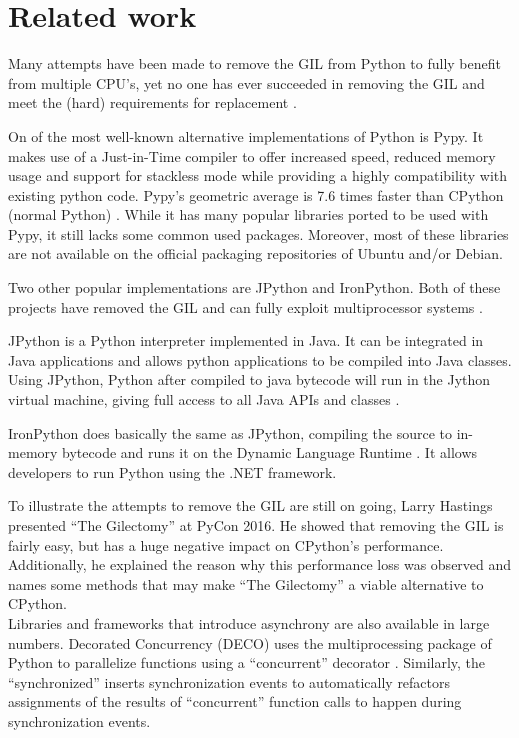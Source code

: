 \chapter{Related work}

Many attempts have been made to remove the GIL from Python to fully benefit from multiple CPU's, yet no one has ever succeeded in removing the GIL and meet the (hard) requirements for replacement \cite{python2015global}.

On of the most well-known alternative implementations of Python is Pypy.
It makes use of a Just-in-Time compiler to offer increased speed, reduced memory usage and support for stackless mode while providing a highly compatibility with existing python code.
Pypy's geometric average is 7.6 times faster than CPython (normal Python) \cite{pypy2016speed}.
While it has many popular libraries ported to be used with Pypy, it still lacks some common used packages.
Moreover, most of these libraries are not available on the official packaging repositories of Ubuntu and/or Debian.

Two other popular implementations are JPython and IronPython.
Both of these projects have removed the GIL and can fully exploit multiprocessor systems \cite{python2015global}.

JPython is a Python interpreter implemented in Java. It can be integrated in Java applications and allows python applications to be compiled into Java classes.
Using JPython, Python after compiled to java bytecode will run in the Jython virtual machine, giving full access to all Java APIs and classes \cite{jython2016why}.

IronPython does basically the same as JPython, compiling the source to in-memory bytecode and runs it on the Dynamic Language Runtime \cite{ironpython2014}.
It allows developers to run Python using the .NET framework.

To illustrate the attempts to remove the GIL are still on going, Larry Hastings presented ``The Gilectomy'' at PyCon 2016. He showed that removing the GIL is fairly easy, but has a huge negative impact on CPython's performance.
Additionally, he explained the reason why this performance loss was observed and names some methods that may make ``The Gilectomy'' a viable alternative to CPython.\\

Libraries and frameworks that introduce asynchrony are also available in large numbers.
Decorated Concurrency (DECO) uses the multiprocessing package of Python to parallelize functions using a ``concurrent'' decorator \cite{sherman2016deco}.
Similarly, the ``synchronized''  inserts synchronization events to automatically refactors assignments of the results of ``concurrent'' function calls to happen during synchronization events.

